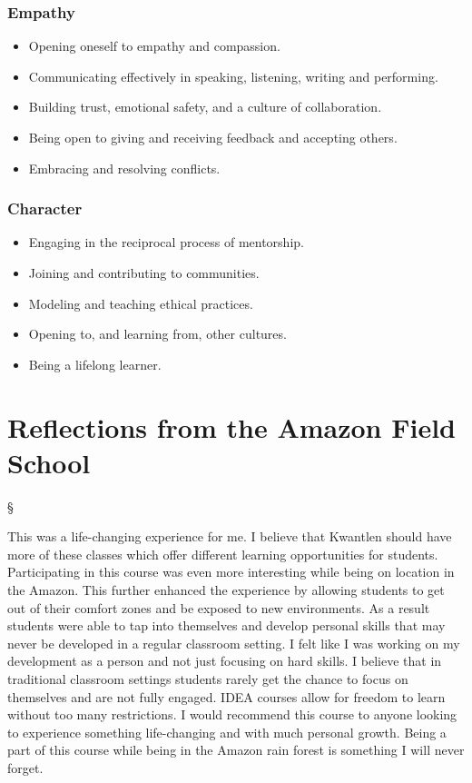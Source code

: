 \documentclass[letterpaper,10pt,headsepline]{scrreprt}
\begin{document}
\subsection{Empathy}

\begin{itemize}
\itemsep1pt\parskip0pt
\item
  Opening oneself to empathy and compassion.
\item
  Communicating effectively in speaking, listening, writing and
  performing.
\item
  Building trust, emotional safety, and a culture of collaboration.
\item
  Being open to giving and receiving feedback and accepting others.
\item
  Embracing and resolving conflicts.
\end{itemize}

\subsection{Character}

\begin{itemize}
\itemsep1pt\parskip0pt
\item
  Engaging in the reciprocal process of mentorship.
\item
  Joining and contributing to communities.
\item
  Modeling and teaching ethical practices.
\item
  Opening to, and learning from, other cultures.
\item
  Being a lifelong learner.
\end{itemize}

\chapter{Reflections from the Amazon Field School}

\begin{center}§\end{center}

This was a life-changing experience for me. I believe that Kwantlen
should have more of these classes which offer different learning
opportunities for students. Participating in this course was even more
interesting while being on location in the Amazon. This further enhanced
the experience by allowing students to get out of their comfort zones
and be exposed to new environments. As a result students were able to
tap into themselves and develop personal skills that may never be
developed in a regular classroom setting. I felt like I was working on
my development as a person and not just focusing on hard skills. I
believe that in traditional classroom settings students rarely get the
chance to focus on themselves and are not fully engaged. IDEA courses
allow for freedom to learn without too many restrictions. I would
recommend this course to anyone looking to experience something
life-changing and with much personal growth. Being a part of this course
while being in the Amazon rain forest is something I will never forget.
\end{document}
